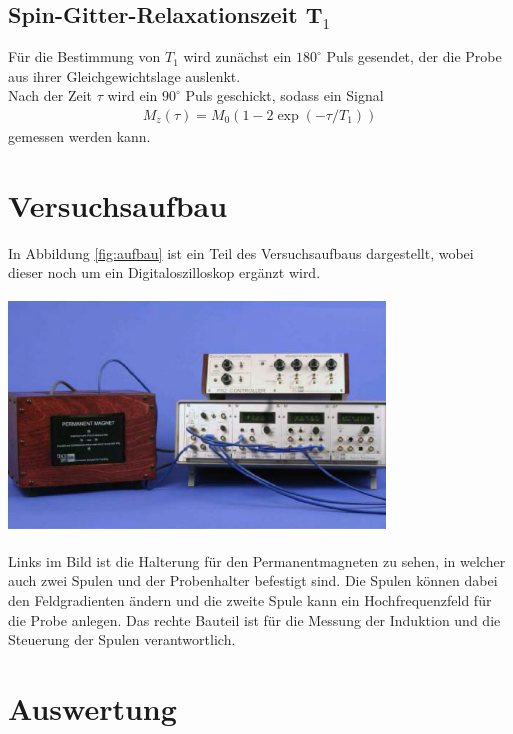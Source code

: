 \documentclass[]{scrartcl}
\begin{document}
\subsection{Spin-Gitter-Relaxationszeit T$_1$}
Für die Bestimmung von $T_1$ wird zunächst ein $180^\circ$ Puls gesendet, der die Probe aus ihrer Gleichgewichtslage auslenkt.\\
Nach der Zeit $\tau$ wird ein $90^\circ$ Puls geschickt, sodass ein Signal 
\begin{align}
M_{z}(\tau)=M_0(1-2\exp(-\tau/T_1))
\label{eq_T1}
\end{align}
gemessen werden kann.
\section{Versuchsaufbau}
In Abbildung \ref{fig:aufbau} ist ein Teil des Versuchsaufbaus dargestellt, wobei dieser noch um ein Digitaloszilloskop ergänzt wird.
\begin{center}
	\includegraphics[width=10cm]{images/aufbau.png}
	\label{fig:aufbau}
\end{center}
Links im Bild ist die Halterung für den Permanentmagneten zu sehen, in welcher auch zwei Spulen und der Probenhalter befestigt sind. Die Spulen können dabei den Feldgradienten ändern und die zweite Spule kann ein Hochfrequenzfeld für die Probe anlegen. Das rechte Bauteil ist für die Messung der Induktion und die Steuerung der Spulen verantwortlich.
\section{Auswertung}
\end{document}
